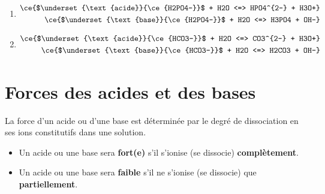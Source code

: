 \documentclass[
  11pt,
  a4paper,
  openany]{book}
\providecommand{\tightlist}{%
  \setlength{\itemsep}{0pt}\setlength{\parskip}{0pt}}
\begin{document}
\begin{Answer}

\begin{enumerate}
\def\labelenumi{\alph{enumi}.}
\tightlist
\item
  \[
  \begin{split}
    \ce{$\underset{\text{acide}}{\ce{H2PO4-}}$ + H2O <=> HPO4^{2-} + H3O+} \\
    \ce{$\underset{\text{base}}{\ce{H2PO4-}}$ + H2O <=> H3PO4 + OH-} \\
  \end{split}
  \]
\item
  \[
  \begin{split}
    \ce{$\underset{\text{acide}}{\ce{HCO3-}}$ + H2O <=> CO3^{2-} + H3O+} \\
    \ce{$\underset{\text{base}}{\ce{HCO3-}}$ + H2O <=> H2CO3 + OH-} \\
  \end{split}
  \]
\end{enumerate}

\end{Answer}

\clearpage

\hypertarget{forces-des-acides-et-des-bases}{%
\section{Forces des acides et des bases}\label{forces-des-acides-et-des-bases}}

La force d'un acide ou d'une base est déterminée par le degré de dissociation en ses ions constitutifs dans une solution.

\begin{itemize}
\tightlist
\item
  Un acide ou une base sera \textbf{fort(e)} s'il s'ionise (se dissocie) \textbf{complètement}.
\item
  Un acide ou une base sera \textbf{faible} s'il ne s'ionise (se dissocie) que \textbf{partiellement}.
\end{itemize}
\end{document}

